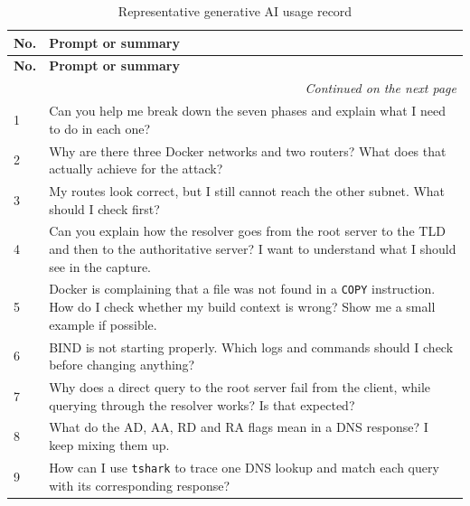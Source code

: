 \documentclass[11pt]{article}
\begin{document}
\begin{longtable}{p{0.8cm}p{12.0cm}}
    \caption{Representative generative AI usage record}
    \label{tab:ai-usage}\\
    \toprule
    \textbf{No.} & \textbf{Prompt or summary}\\
    \midrule
    \endfirsthead

    \toprule
    \textbf{No.} & \textbf{Prompt or summary}\\
    \midrule
    \endhead

    \midrule
    \multicolumn{2}{r}{\textit{Continued on the next page}}\\
    \endfoot

    \bottomrule
    \endlastfoot

    1 &
    Can you help me break down the seven phases and explain what I need
    to do in each one?\\

    2 &
    Why are there three Docker networks and two routers? What does that
    actually achieve for the attack?\\

    3 &
    My routes look correct, but I still cannot reach the other subnet.
    What should I check first?\\

    4 &
    Can you explain how the resolver goes from the root server to the
    TLD and then to the authoritative server? I want to understand what
    I should see in the capture.\\

    5 &
    Docker is complaining that a file was not found in a \texttt{COPY}
    instruction. How do I check whether my build context is wrong? Show
    me a small example if possible.\\

    6 &
    BIND is not starting properly. Which logs and commands should I
    check before changing anything?\\

    7 &
    Why does a direct query to the root server fail from the client,
    while querying through the resolver works? Is that expected?\\

    8 &
    What do the AD, AA, RD and RA flags mean in a DNS response? I keep
    mixing them up.\\

    9 &
    How can I use \texttt{tshark} to trace one DNS lookup and match
    each query with its corresponding response?\\


\end{longtable}
\end{document}
